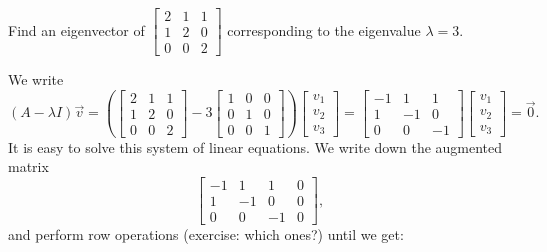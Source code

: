 \documentclass{ximera}
\begin{document}
\begin{example}
    Find an eigenvector of
    $\left[ 
        \begin{smallmatrix}
            2 & 1 & 1 \\
            1 & 2 & 0 \\
            0 & 0 & 2
        \end{smallmatrix} 
    \right]$ 
    corresponding to the eigenvalue $\lambda = 3$.
\end{example}

\begin{exampleSol}
We write
\begin{equation*}
(A-\lambda I) \vec{v} = 
\left(
    \begin{bmatrix}
        2 & 1 & 1 \\
        1 & 2 & 0 \\
        0 & 0 & 2
    \end{bmatrix}
    - 3
    \begin{bmatrix}
        1 & 0 & 0 \\
        0 & 1 & 0 \\
        0 & 0 & 1
    \end{bmatrix}
\right)
\begin{bmatrix}
    v_1 \\ 
    v_2 \\ 
    v_3
\end{bmatrix}
=
\begin{bmatrix}
    -1 & 1 & 1 \\
    1 & -1 & 0 \\
    0 & 0 & -1
\end{bmatrix}
\begin{bmatrix}
    v_1 \\ 
    v_2 \\ 
    v_3
\end{bmatrix}
= \vec{0} .
\end{equation*}
It is easy to solve this system of linear equations.  We write down the augmented matrix 
\begin{equation*}
\left[
    \begin{array}{ccc|c}
        -1 & 1 & 1 & 0 \\
        1 & -1 & 0 & 0 \\
        0 & 0 & -1 & 0
    \end{array}
\right] ,
\end{equation*}
and perform row operations (exercise: which ones?) until we get:
\begin{equation*}

\end{equation*}
\end{exampleSol}
\end{document}
